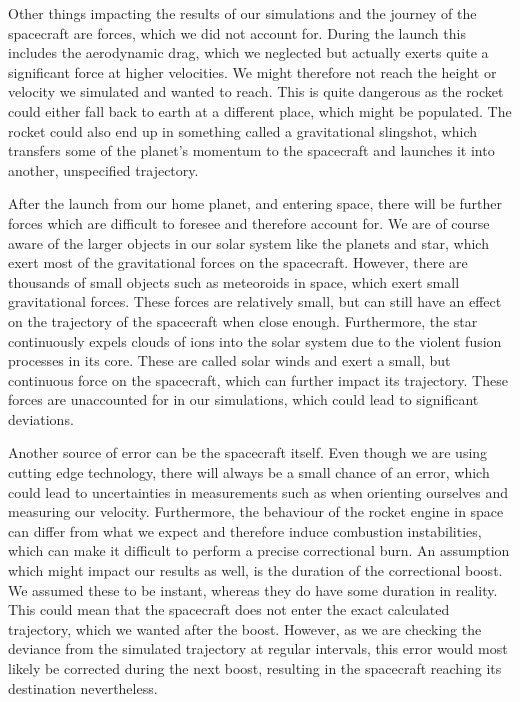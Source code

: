 \documentclass[reprint,english,notitlepage]{revtex4-2}
\begin{document}
Other things impacting the results of our simulations and the journey of the spacecraft are forces, which we did not account for.
During the launch this includes the aerodynamic drag, which we neglected but actually exerts quite a significant force at higher velocities.
We might therefore not reach the height or velocity we simulated and wanted to reach.
This is quite dangerous as the rocket could either fall back to earth at a different place, which might be populated.
The rocket could also end up in something called a gravitational slingshot, which transfers some of the planet's momentum to the spacecraft and launches it into another, unspecified trajectory.

After the launch from our home planet, and entering space, there will be further forces which are difficult to foresee and therefore account for.
We are of course aware of the larger objects in our solar system like the planets and star, which exert most of the gravitational forces on the spacecraft.
However, there are thousands of small objects such as meteoroids in space, which exert small gravitational forces.
These forces are relatively small, but can still have an effect on the trajectory of the spacecraft when close enough.
Furthermore, the star continuously expels clouds of ions into the solar system due to the violent fusion processes in its core.
These are called solar winds and exert a small, but continuous force on the spacecraft, which can further impact its trajectory.
These forces are unaccounted for in our simulations, which could lead to significant deviations.

Another source of error can be the spacecraft itself.
Even though we are using cutting edge technology, there will always be a small chance of an error, which could lead to uncertainties in measurements such as when orienting ourselves and measuring our velocity.
Furthermore, the behaviour of the rocket engine in space can differ from what we expect and therefore induce combustion instabilities, which can make it difficult to perform a precise correctional burn.
An assumption which might impact our results as well, is the duration of the correctional boost.
We assumed these to be instant, whereas they do have some duration in reality.
This could mean that the spacecraft does not enter the exact calculated trajectory, which we wanted after the boost.
However, as we are checking the deviance from the simulated trajectory at regular intervals, this error would most likely be corrected during the next boost, resulting in the spacecraft reaching its destination nevertheless.
\end{document}
